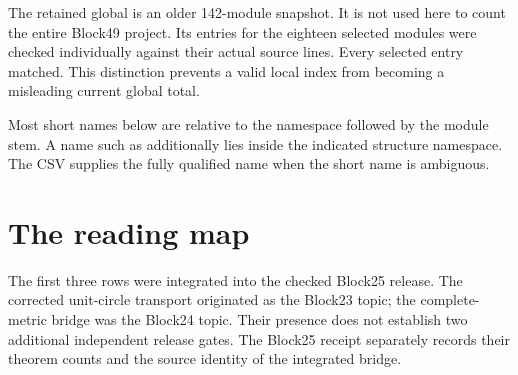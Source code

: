 The retained global  is an older 142-module snapshot. It is not used here to count the entire Block49 project. Its entries for the eighteen selected modules were checked individually against their actual source lines. Every selected entry matched. This distinction prevents a valid local index from becoming a misleading current global total.

Most short names below are relative to the namespace  followed by the module stem. A name such as  additionally lies inside the indicated structure namespace. The CSV supplies the fully qualified name when the short name is ambiguous.

\clearpage
\section{The reading map}

The first three rows were integrated into the checked Block25 release. The corrected unit-circle transport originated as the Block23 topic; the complete-metric bridge was the Block24 topic. Their presence does not establish two additional independent release gates. The Block25 receipt separately records their theorem counts and the source identity of the integrated bridge.

